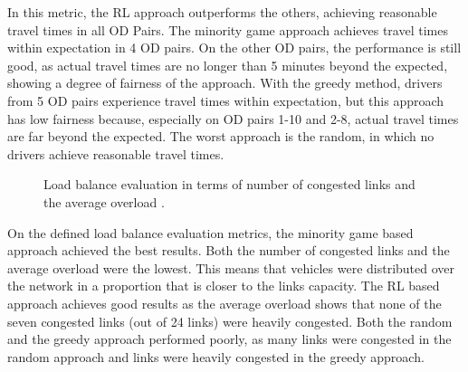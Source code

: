 \documentclass{RITA}
\begin{document}
In this metric, the RL approach outperforms the others, achieving reasonable travel times in all OD Pairs. The minority game approach achieves travel times within expectation in 4 OD pairs. On the other OD pairs, the performance is still good, as actual travel times are no longer than 5 minutes beyond the expected, showing a degree of fairness of the approach. With the greedy method, drivers from 5 OD pairs experience travel times within expectation, but this approach has low fairness because, especially on OD pairs 1-10 and 2-8, actual travel times are far beyond the expected. The worst approach is the random, in which no drivers achieve reasonable travel times.


\begin{figure}[ht]
  \centering
  \caption{Load balance evaluation in terms of number of congested links  and the average overload .}
  \label{fig:loadBalance}
\end{figure}

On the defined load balance evaluation metrics, the minority game based approach achieved the best results. Both the number of congested links and the average overload were the lowest. This means that vehicles were distributed over the network in a proportion that is closer to the links capacity. The RL based approach achieves good results as the average overload shows that none of the seven congested links (out of 24 links) were heavily congested. Both the random and the greedy approach performed poorly, as many links were congested in the random approach and links were heavily congested in the greedy approach.
\end{document}
